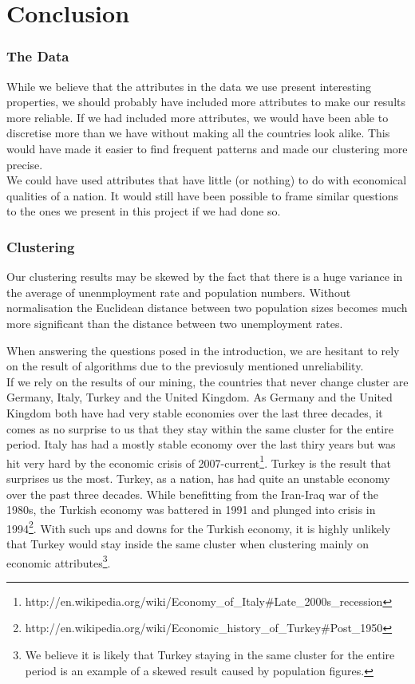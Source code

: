 \section{Conclusion}
\label{Con}
\subsubsection*{The Data}
While we believe that the attributes in the data we use present interesting properties, we should probably have included more attributes to make our results more reliable. If we had included more attributes, we would have been able to discretise more than we have without making all the countries look alike. This would have made it easier to find frequent patterns and made our clustering more precise.
\\We could have used attributes that have little (or nothing) to do with economical qualities of a nation. It would still have been possible to frame similar questions to the ones we present in this project if we had done so.
\subsubsection*{Clustering}
Our clustering results may be skewed by the fact that there is a huge variance in the average of unenmployment rate and population numbers. Without normalisation the Euclidean distance between two population sizes becomes much more significant than the distance between two unemployment rates.

When answering the questions posed in the introduction, we are hesitant to rely on the result of algorithms due to the previosuly mentioned unreliability.
\\If we rely on the results of our mining, the countries that never change cluster are Germany, Italy, Turkey and the United Kingdom. As Germany and the United Kingdom both have had very stable economies over the last three decades, it comes as no surprise to us that they stay within the same cluster for the entire period. Italy has had a mostly stable economy over the last thiry years but was hit very hard by the economic crisis of 2007-current\footnote{http://en.wikipedia.org/wiki/Economy\_of\_Italy\#Late\_2000s\_recession}. Turkey is the result that surprises us the most. Turkey, as a nation, has had quite an unstable economy over the past three decades. While benefitting from the Iran-Iraq war of the 1980s, the Turkish economy was battered in 1991 and plunged into crisis in 1994\footnote{http://en.wikipedia.org/wiki/Economic\_history\_of\_Turkey\#Post\_1950}. With such ups and downs for the Turkish economy, it is highly unlikely that Turkey would stay inside the same cluster when clustering mainly on economic attributes\footnote{We believe it is likely that Turkey staying in the same cluster for the entire period is an example of a skewed result caused by population figures.}. 

